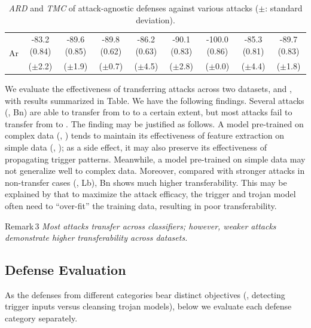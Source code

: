 \documentclass[compsoc,conference,a4paper,10pt,times]{IEEEtran}
\newcommand{\bn}{{\sc Bn}\xspace}
\newcommand{\lb}{{\sc Lb}\xspace}
\newcommand{\tmc}{{\em \small TMC}\xspace}
\newcommand{\ard}{{\em \small ARD}\xspace}
\newcommand{\at}{{\sc Ar}\xspace}
\begin{document}
\begin{table}[!ht]
{\begin{tabular}{c|c|c|c|c|c|c|c|c}
        \hline
        \multirow{2}{*}{\at}         & \cellcolor{Red}-83.2 (0.84) & \cellcolor{Red}-89.6 (0.85) & \cellcolor{Red}-89.8 (0.62) & \cellcolor{Red}-86.2 (0.63) & \cellcolor{Red}-90.1 (0.83) & \cellcolor{Red}-100.0 (0.86) & \cellcolor{Red}-85.3 (0.81) & \cellcolor{Red}-89.7 (0.83) \\
                                     & \cellcolor{Red}($\pm$2.2) & \cellcolor{Red}($\pm$1.9) & \cellcolor{Red}($\pm$0.7) & \cellcolor{Red}($\pm$4.5) & \cellcolor{Red}($\pm$2.8) & \cellcolor{Red}($\pm$0.0) & \cellcolor{Red}($\pm$4.4) & \cellcolor{Red}($\pm$1.8) \\
    \end{tabular}
    \caption{\ard and \tmc of attack-agnostic defenses against various attacks ($\pm$: standard deviation). \label{tab:attack-agnostic}}}
\end{table}


We evaluate the effectiveness of transferring attacks across two datasets, \cifar and \imgnet, with results summarized in Table. We have the following findings. Several attacks (\meg, \bn) are able to transfer from \imgnet to \cifar to a certain extent, but most attacks fail to transfer from \cifar to \imgnet. The finding may be justified as follows. A model pre-trained on complex data (\mie, \imgnet) tends to maintain its effectiveness of feature extraction on simple data (\mie, \cifar); as a side effect, it may also preserve its effectiveness of propagating trigger patterns. Meanwhile, a model pre-trained on simple data may not generalize well to complex data. Moreover, compared with stronger attacks in non-transfer cases (\meg, \lb), \bn shows much higher transferability. This may be explained by that to maximize the attack efficacy, the trigger and trojan model often need to ``over-fit'' the training data, resulting in poor transferability.  

\begin{mtbox}{\small Remark\,3}
{\em \small Most attacks transfer across classifiers; however, weaker attacks demonstrate higher transferability across datasets.}
\end{mtbox}


\subsection{Defense Evaluation}
\label{sec:defense-eval}

As the defenses from different categories bear distinct objectives (\meg, detecting trigger inputs versus cleansing trojan models), below we evaluate each defense category separately.
\end{document}
